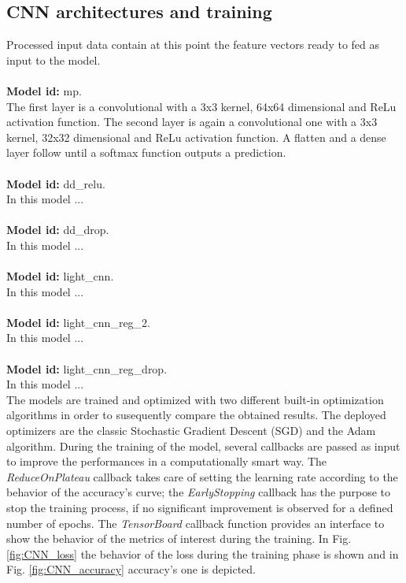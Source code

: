 \subsection*{\textbf {CNN architectures and training}}Processed input data contain at this point the feature vectors ready to fed as input to the model. \\ \\
\noindent 
\textbf{Model id: }mp.\\The first layer is a convolutional with a 3x3 kernel, 64x64 dimensional and ReLu activation function. The second layer is again a convolutional one with a 3x3 kernel, 32x32 dimensional and ReLu activation function. A flatten and a dense layer follow until a softmax function outputs a prediction. \\ \\ 
\textbf{Model id: }dd\_relu.\\ In this model ... \\ \\ 
\textbf{Model id: }dd\_drop.\\ In this model ... \\ \\ 
\textbf{Model id: }light\_cnn.\\ In this model ... \\ \\ 
\textbf{Model id: }light\_cnn\_reg\_2.\\ In this model ... \\ \\
\textbf{Model id: }light\_cnn\_reg\_drop.\\ In this model ... \\ 

The models are trained and optimized with two different built-in optimization algorithms in order to susequently compare the obtained results. The deployed optimizers are the classic Stochastic Gradient Descent (SGD) and the Adam algorithm. During the training of the model, several callbacks are passed as input to improve the performances in a computationally smart way. The {\it{ReduceOnPlateau}} callback takes care of setting the learning rate according to the behavior of the accuracy's curve; the {\it{EarlyStopping}} callback has the purpose to stop the training process, if no significant improvement is observed for a defined number of epochs. The {\it{TensorBoard}} callback function provides an interface to show the behavior of the metrics of interest during the training. In Fig. \ref{fig:CNN_loss} the behavior of the loss during the training phase is shown and in Fig.  \ref{fig:CNN_accuracy} accuracy's one is depicted.

